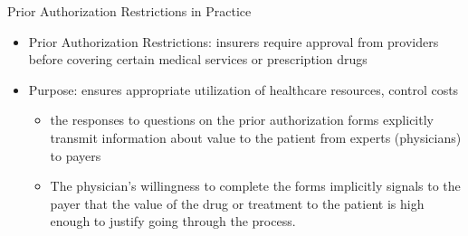 \begin{frame}{Prior Authorization Restrictions in Practice}
    \begin{itemize}
        \item  Prior Authorization Restrictions: insurers require approval from providers before covering certain medical services or prescription drugs 
       
        \item Purpose: ensures appropriate utilization of healthcare resources, control costs
        \begin{itemize}
            \item the responses to questions on the prior authorization forms explicitly transmit information about value to the patient from experts (physicians) to payers
            \item The physician’s willingness to complete the forms implicitly signals to the payer that the value of the drug or treatment to the patient is high enough to justify going through the process.
        \end{itemize}
    \end{itemize}
\end{frame}